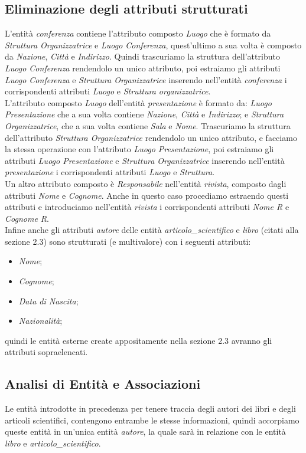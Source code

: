 \documentclass{article}
\begin{document}
\subsection{Eliminazione degli attributi strutturati}
L'entità \textit{conferenza} contiene l'attributo composto \textit{Luogo} che è formato da \textit{Struttura Organizzatrice} e \textit{Luogo Conferenza}, quest'ultimo a sua volta è composto da \textit{Nazione}, \textit{Città} e \textit{Indirizzo}. Quindi trascuriamo la struttura dell'attributo \textit{Luogo Conferenza} rendendolo un unico attributo, poi estraiamo gli attributi \textit{Luogo Conferenza} e \textit{Struttura Organizzatrice} inserendo nell'entità \textit{conferenza} i corrispondenti attributi \textit{Luogo} e \textit{Struttura organizzatrice}.\\
L'attributo composto \textit{Luogo} dell'entità \textit{presentazione} è formato da: \textit{Luogo Presentazione} che a sua volta contiene \textit{Nazione}, \textit{Città} e \textit{Indirizzo}; e \textit{Struttura Organizzatrice}, che a sua volta contiene \textit{Sala} e \textit{Nome}. Trascuriamo la struttura dell'attributo \textit{Struttura Organizzatrice} rendendolo un unico attributo, e facciamo la stessa operazione con l'attributo  \textit{Luogo Presentazione}, poi  estraiamo gli attributi  \textit{Luogo Presentazione} e \textit{Struttura Organizzatrice} inserendo nell'entità \textit{presentazione} i corrispondenti attributi \textit{Luogo} e \textit{Struttura}.\\
Un altro attributo composto è \textit{Responsabile} nell'entità \textit{rivista}, composto dagli attributi \textit{Nome} e \textit{Cognome}. Anche in questo caso procediamo estraendo questi attributi e introduciamo nell'entità \textit{rivista} i corrispondenti attributi \textit{Nome R} e \textit{Cognome R}.\\
Infine anche gli attributi \textit{autore} delle entità \textit{articolo\_scientifico} e \textit{libro} (citati alla sezione 2.3) sono strutturati (e multivalore) con i seguenti attributi: \begin{itemize} 
\item \textit{Nome}; 
\item \textit{Cognome};
\item \textit{Data di Nascita};
\item \textit{Nazionalità};
\end{itemize}
quindi le entità esterne create appositamente nella sezione 2.3 avranno gli attributi sopraelencati.

\subsection{Analisi di Entità e Associazioni}
Le entità introdotte in precedenza per tenere traccia degli autori dei libri e degli articoli scientifici, contengono entrambe le stesse informazioni, quindi accorpiamo queste entità in un'unica entità \textit{autore}, la quale sarà in relazione con le entità \textit{libro} e \textit{articolo\_scientifico}.
\end{document}
